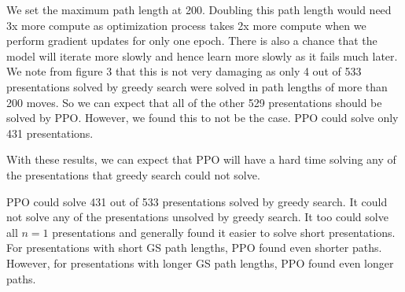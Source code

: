 We set the maximum path length at 200. Doubling this path length would need 3x more compute as optimization process takes 2x more compute when we perform gradient updates for only one epoch. There is also a chance that the model will iterate more slowly and hence learn more slowly as it fails much later. We note from figure 3 that this is not very damaging as only 4 out of 533 presentations solved by greedy search were solved in path lengths of more than 200 moves. So we can expect that all of the other 529 presentations should be solved by PPO. However, we found this to not be the case. PPO could solve only 431 presentations. 

With these results, we can expect that PPO will have a hard time solving any of the presentations that greedy search could not solve. 



PPO could solve 431 out of 533 presentations solved by greedy search. It could not solve any of the presentations unsolved by greedy search. It too could solve all $n=1$ presentations and generally found it easier to solve short presentations. For presentations with short GS path lengths, PPO found even shorter paths. However, for presentations with longer GS path lengths, PPO found even longer paths. 

